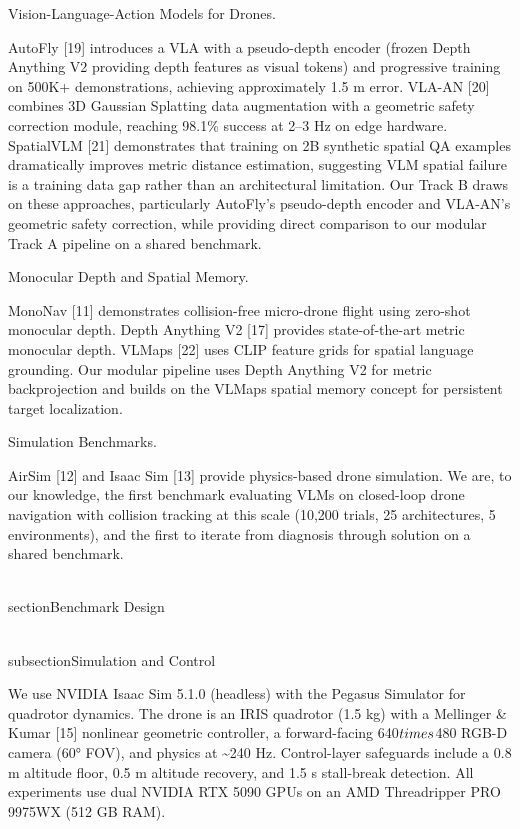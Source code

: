 \documentclass[conference]{IEEEtran}
\begin{document}
Vision-Language-Action Models for Drones.

AutoFly [19] introduces a VLA with a pseudo-depth encoder (frozen
Depth Anything V2 providing depth features as visual tokens) and
progressive training on 500K+ demonstrations, achieving approximately
1.5 m error. VLA-AN [20] combines 3D Gaussian Splatting data
augmentation with a geometric safety correction module, reaching 98.1\%
success at 2--3 Hz on edge hardware. SpatialVLM [21] demonstrates
that training on 2B synthetic spatial QA examples dramatically improves
metric distance estimation, suggesting VLM spatial failure is a training
data gap rather than an architectural limitation. Our Track B draws on
these approaches, particularly AutoFly's pseudo-depth encoder and
VLA-AN's geometric safety correction, while providing direct comparison
to our modular Track A pipeline on a shared benchmark.

Monocular Depth and Spatial Memory.

MonoNav [11] demonstrates collision-free micro-drone flight using
zero-shot monocular depth. Depth Anything V2 [17] provides
state-of-the-art metric monocular depth. VLMaps [22] uses CLIP
feature grids for spatial language grounding. Our modular pipeline uses
Depth Anything V2 for metric backprojection and builds on the VLMaps
spatial memory concept for persistent target localization.

Simulation Benchmarks.

AirSim [12] and Isaac Sim [13] provide physics-based drone
simulation. We are, to our knowledge, the first benchmark evaluating
VLMs on closed-loop drone navigation with collision tracking at this
scale (10,200 trials, 25 architectures, 5 environments), and the first
to iterate from diagnosis through solution on a shared benchmark.

\\section{Benchmark Design}\label{iii.-benchmark-design}

\\subsection{Simulation and Control}\label{a.-simulation-and-control}

We use NVIDIA Isaac Sim 5.1.0 (headless) with the Pegasus Simulator for
quadrotor dynamics. The drone is an IRIS quadrotor (1.5 kg) with a
Mellinger \& Kumar [15] nonlinear geometric controller, a
forward-facing 640$\\times$480 RGB-D camera (60° FOV), and physics at
\textasciitilde240 Hz. Control-layer safeguards include a 0.8 m altitude
floor, 0.5 m altitude recovery, and 1.5 s stall-break detection. All
experiments use dual NVIDIA RTX 5090 GPUs on an AMD Threadripper PRO
9975WX (512 GB RAM).
\end{document}
